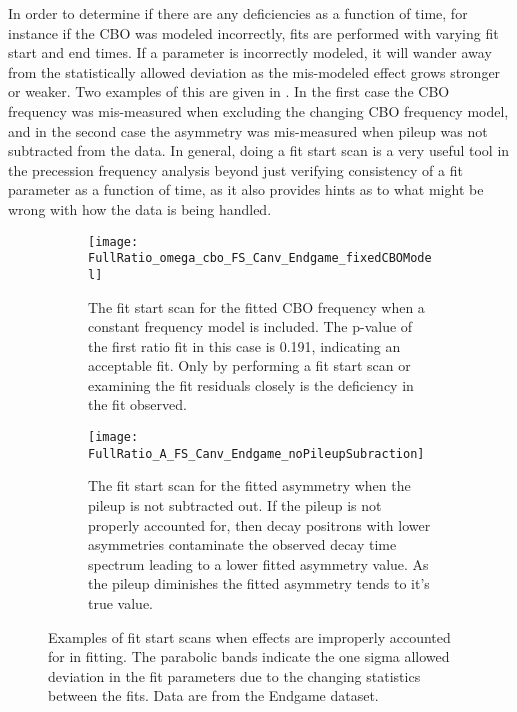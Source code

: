 In order to determine if there are any deficiencies as a function of time, for instance if the CBO was modeled incorrectly, fits are performed with varying fit start and end times. If a parameter is incorrectly modeled, it will wander away from the statistically allowed deviation as the mis-modeled effect grows stronger or weaker. Two examples of this are given in . In the first case the CBO frequency was mis-measured when excluding the changing CBO frequency model, and in the second case the asymmetry was mis-measured when pileup was not subtracted from the data. In general, doing a fit start scan is a very useful tool in the precession frequency analysis beyond just verifying consistency of a fit parameter as a function of time, as it also provides hints as to what might be wrong with how the data is being handled.


\begin{figure}
\centering
    \begin{subfigure}[t]{0.45\textwidth}
        \centering
        \texttt{[image: FullRatio\_omega\_cbo\_FS\_Canv\_Endgame\_fixedCBOModel]}
        \caption{The fit start scan for the fitted CBO frequency when a constant frequency model is included. The p-value of the first ratio fit in this case is 0.191, indicating an acceptable fit. Only by performing a fit start scan or examining the fit residuals closely is the deficiency in the fit observed.}
    \end{subfigure}%
    \hspace{4mm}
    \begin{subfigure}[t]{0.45\textwidth}
        \centering
        \texttt{[image: FullRatio\_A\_FS\_Canv\_Endgame\_noPileupSubraction]}
        \caption{The fit start scan for the fitted asymmetry when the pileup is not subtracted out. If the pileup is not properly accounted for, then decay positrons with lower asymmetries contaminate the observed decay time spectrum leading to a lower fitted asymmetry value. As the pileup diminishes the fitted asymmetry tends to it's true value.}
    \end{subfigure}
\caption[Examples of fit start scans when effects are improperly accounted for in fitting]{Examples of fit start scans when effects are improperly accounted for in fitting. The parabolic bands indicate the one sigma allowed deviation in the fit parameters due to the changing statistics between the fits. Data are from the Endgame dataset.}
\label{fig:badStartScans}
\end{figure}



